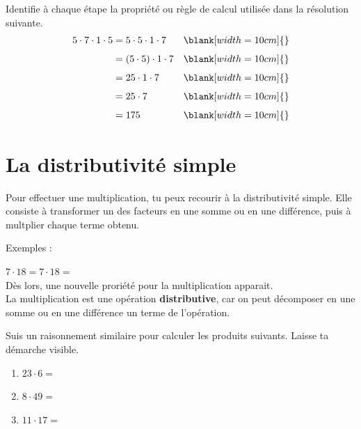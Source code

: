 \documentclass[../../syllabus_1.tex]{subfiles}
\begin{document}
\begin{exercise}
    Identifie à chaque étape la propriété ou règle de calcul utilisée dans la résolution suivante.
    \begin{align*}
        5 \cdot 7 \cdot 1 \cdot 5
         & = 5 \cdot 5 \cdot 1 \cdot 7   &  & \blank[width=10cm]{} \\[1ex]
         & = (5 \cdot 5) \cdot 1 \cdot 7 &  & \blank[width=10cm]{} \\[1ex]
         & = 25 \cdot 1 \cdot 7          &  & \blank[width=10cm]{} \\[1ex]
         & = 25 \cdot 7                  &  & \blank[width=10cm]{} \\[1ex]
         & = 175                         &  & \blank[width=10cm]{} \\
    \end{align*}
\end{exercise}

\newpage
\section{La distributivité simple}

Pour effectuer une multiplication, tu peux recourir à la distributivité simple. Elle consiste à transformer un des facteurs en une somme ou en une différence, puis à multplier chaque terme obtenu.

Exemples :

\(7 \cdot 18 =\)\hfil\( 7 \cdot 18 =\)
\vspace*{4cm}
\\
Dès lors, une nouvelle proriété pour la multiplication apparait.
\\
La multiplication est une opération \textbf{distributive}, car on peut décomposer en une somme ou en une différence un terme de l'opération.

\begin{exercise}
    Suis un raisonnement similaire pour calculer les produits suivants. Laisse ta démarche visible.
    \begin{enumerate}[cols=3]
        \item $23 \cdot 6=$
        \item $8 \cdot 49=$
        \item $11 \cdot 17=$
    \end{enumerate}
    \vspace*{4cm}
\end{exercise}


\newpage
\end{document}
